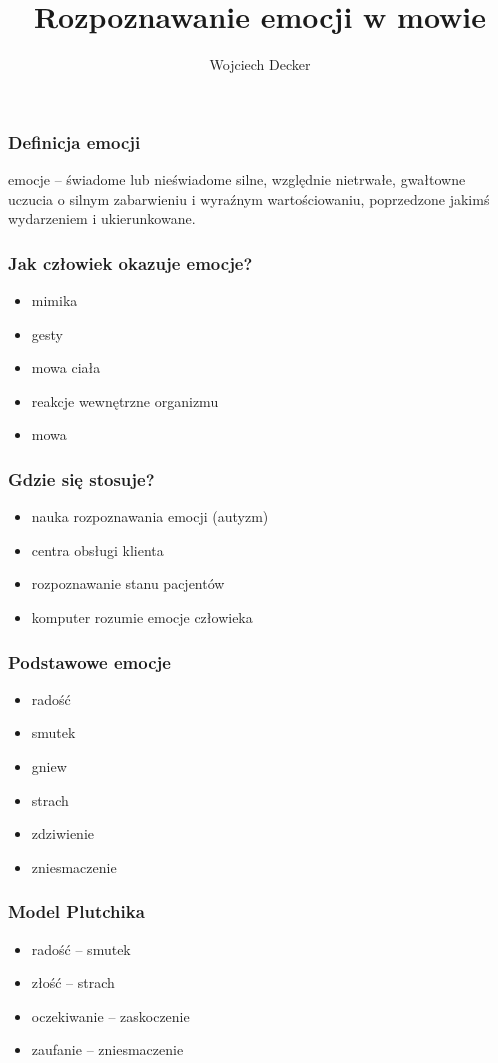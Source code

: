 \documentclass{beamer}
\begin{document}
\title{Rozpoznawanie emocji w mowie}
\author{Wojciech Decker}
\maketitle
\begin{frame}
  \frametitle{Definicja emocji}
  emocje – świadome lub nieświadome silne, względnie nietrwałe, gwałtowne uczucia o silnym zabarwieniu i wyraźnym wartościowaniu, poprzedzone jakimś wydarzeniem i ukierunkowane. 
\end{frame}
\begin{frame}
  \frametitle{Jak człowiek okazuje emocje?}
  \begin{itemize}
    \item mimika
    \item gesty
    \item mowa ciała
    \item reakcje wewnętrzne organizmu
    \item mowa
  \end{itemize}
\end{frame}
\begin{frame}
  \frametitle{Gdzie się stosuje?}
  \begin{itemize}
    \item nauka rozpoznawania emocji (autyzm)
    \item centra obsługi klienta
    \item rozpoznawanie stanu pacjentów
    \item komputer rozumie emocje człowieka
  \end{itemize}
\end{frame}
\begin{frame}
  \frametitle{Podstawowe emocje}
  \begin{itemize}
    \item radość
    \item smutek
    \item gniew
    \item strach
    \item zdziwienie
    \item zniesmaczenie
  \end{itemize}
\end{frame}
\begin{frame}
  \frametitle{Model Plutchika}
  \begin{itemize}
	\item radość – smutek
	\item złość – strach
	\item oczekiwanie – zaskoczenie
	\item zaufanie – zniesmaczenie
  \end{itemize}
\end{frame}
\end{document}
